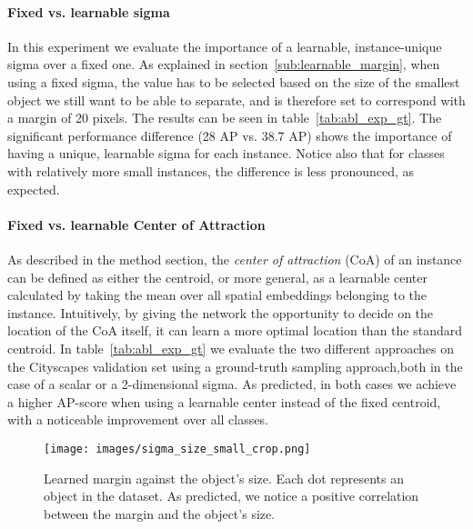 \paragraph{Fixed vs. learnable sigma}
In this experiment we evaluate the importance of a learnable, instance-unique sigma over a fixed one. As explained in section~\ref{sub:learnable_margin}, when using a fixed sigma, the value has to be selected based on the size of the smallest object we still want to be able to separate, and is therefore set to correspond with a margin of 20 pixels. The results can be seen in table~\ref{tab:abl_exp_gt}. The significant performance difference (28 AP vs. 38.7 AP) shows the importance of having a unique, learnable sigma for each instance. Notice also that for classes with relatively more small instances, the difference is less pronounced, as expected.

\paragraph{Fixed vs. learnable Center of Attraction}
As described in the method section, the \textit{center of attraction} (CoA) of an instance can be defined as either the centroid, or more general, as a learnable center calculated by taking the mean over all spatial embeddings belonging to the instance. Intuitively, by giving the network the opportunity to decide on the location of the CoA itself, it can learn a more optimal location than the standard centroid. In table~\ref{tab:abl_exp_gt} we evaluate the two different approaches on the Cityscapes validation set using a ground-truth sampling approach,both in the case of a scalar or a 2-dimensional sigma. As predicted, in both cases we achieve a higher AP-score when using a learnable center instead of the fixed centroid, with a noticeable improvement over all classes. 

\begin{figure}
    \begin{center}
    	\texttt{[image: images/sigma\_size\_small\_crop.png]}
    \end{center}
    \caption{Learned margin against the object's size. Each dot represents an object in the dataset. As predicted, we notice a positive correlation between the margin and the object's size.}
    \label{fig:sigma_vs_size}
\end{figure}

